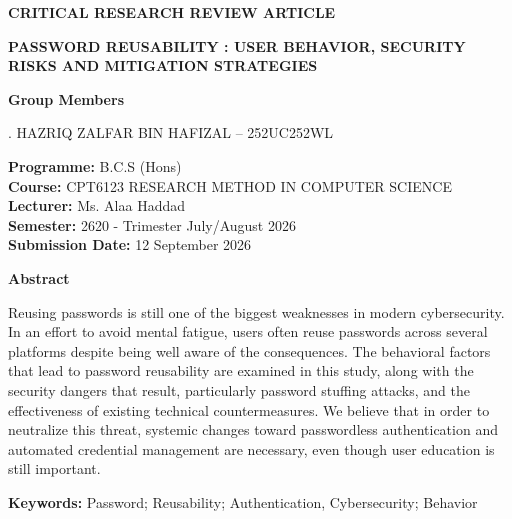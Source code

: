 \documentclass[12pt,a4paper]{article}
\begin{document}
\begin{center}

{\fontsize{18}{22}\selectfont\textbf{CRITICAL RESEARCH REVIEW ARTICLE}}

\vspace{0.5cm}

{\fontsize{18}{22}\selectfont\textbf{PASSWORD REUSABILITY : USER BEHAVIOR, SECURITY RISKS AND MITIGATION STRATEGIES}}

\vspace{1cm}

{\fontsize{12}{14}\selectfont\textbf{Group Members}}

\vspace{0.3cm}

{\fontsize{12}{14}. HAZRIQ ZALFAR BIN HAFIZAL -- 252UC252WL
}

\vspace{0.8cm}

{\fontsize{12}{14}\selectfont
\textbf{Programme:} B.C.S (Hons)\\
\textbf{Course:} CPT6123 RESEARCH METHOD IN COMPUTER SCIENCE\\
\textbf{Lecturer:} Ms. Alaa Haddad\\
\textbf{Semester:} 2620 - Trimester July/August 2026\\
\textbf{Submission Date:} 12 September 2026
}

\end{center}



\vspace{0.5cm}

\noindent
\textbf{Abstract}

\vspace{0.2cm}

\begin{justify}

Reusing passwords is still one of the biggest weaknesses in modern cybersecurity. 
In an effort to avoid mental fatigue, users often reuse passwords across several platforms despite being well aware of the consequences. 
The behavioral factors that lead to password reusability are examined in this study, along with the security dangers that result, particularly password stuffing attacks, and the effectiveness of existing technical countermeasures. 
We believe that in order to neutralize this threat, systemic changes toward passwordless authentication and automated credential management are necessary, even though user education is still important.


\vspace{0.3cm}

\textbf{Keywords:} Password; Reusability; Authentication, Cybersecurity; Behavior

\end{justify}
\end{document}
